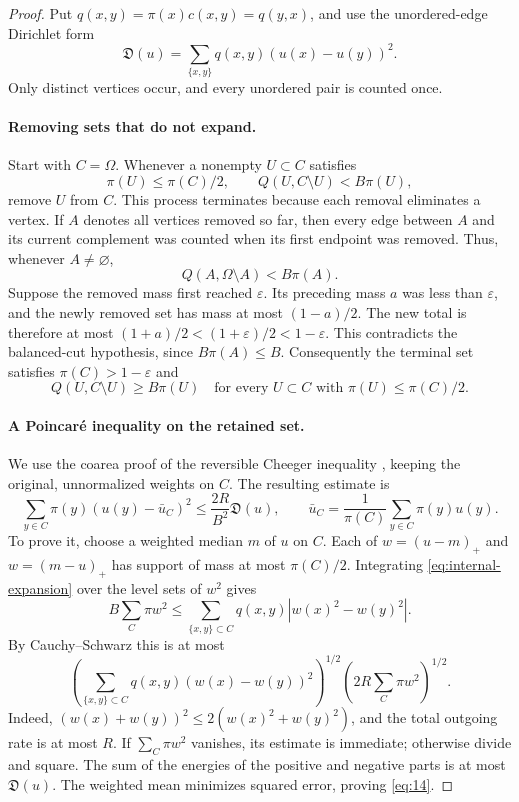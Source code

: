\begin{proof}
Put $q(x,y)=\pi(x)c(x,y)=q(y,x)$, and use the unordered-edge
Dirichlet form
\[
 \mathfrak D(u)=\sum_{\{x,y\}}q(x,y)(u(x)-u(y))^2.
\]
Only distinct vertices occur, and every unordered pair is counted once.

\paragraph{Removing sets that do not expand.}
Start with $C=\Omega$. Whenever a nonempty $U\subset C$ satisfies
\[
 \pi(U)\le\pi(C)/2,\qquad Q(U,C\setminus U)<B\pi(U),
\]
remove $U$ from $C$. This process terminates because each removal
eliminates a vertex. If $A$ denotes all vertices removed so far,
then every edge between $A$ and its current complement was counted
when its first endpoint was removed. Thus, whenever $A\ne\varnothing$,
\[
 Q(A,\Omega\setminus A)<B\pi(A).
\]
Suppose the removed mass first reached $\varepsilon$. Its preceding
mass $a$ was less than $\varepsilon$, and the newly removed set has
mass at most $(1-a)/2$. The new total is therefore at most
$(1+a)/2<(1+\varepsilon)/2<1-\varepsilon$. This contradicts
the balanced-cut hypothesis, since $B\pi(A)\le B$.
Consequently the terminal set satisfies $\pi(C)>1-\varepsilon$
and
\begin{equation}\label{eq:internal-expansion}
 Q(U,C\setminus U)\ge B\pi(U)
 \quad\text{for every }U\subset C\text{ with }\pi(U)\le\pi(C)/2.
\end{equation}

\paragraph{A Poincar\'e inequality on the retained set.}
We use the coarea proof of the reversible Cheeger inequality
\cite[Theorem~3.5]{LawlerSokal1988}, keeping the original,
unnormalized weights on $C$. The resulting estimate is
\begin{equation}\label{eq:14}
 \sum_{y\in C}\pi(y)(u(y)-\bar u_C)^2
 \le\frac{2R}{B^2}\mathfrak D(u),
 \qquad \bar u_C=\frac1{\pi(C)}\sum_{y\in C}\pi(y)u(y).
\end{equation}
To prove it, choose a weighted median $m$ of $u$ on $C$. Each of
$w=(u-m)_+$ and $w=(m-u)_+$ has support of mass at most
$\pi(C)/2$. Integrating \eqref{eq:internal-expansion} over the
level sets of $w^2$ gives
\[
 B\sum_C\pi w^2
 \le\sum_{\{x,y\}\subset C}q(x,y)|w(x)^2-w(y)^2|.
\]
By Cauchy--Schwarz this is at most
\[
 \left(\sum_{\{x,y\}\subset C}q(x,y)(w(x)-w(y))^2\right)^{1/2}
 \left(2R\sum_C\pi w^2\right)^{1/2}.
\]
Indeed, $(w(x)+w(y))^2\le2(w(x)^2+w(y)^2)$, and the total outgoing
rate is at most $R$. If $\sum_C\pi w^2$ vanishes, its estimate
is immediate; otherwise divide and square. The sum of the energies
of the positive and negative parts is at most $\mathfrak D(u)$.
The weighted mean minimizes squared error, proving \eqref{eq:14}.


\end{proof}
